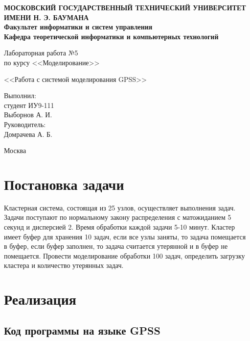 \documentclass[12pt,a4paper,oneside]{extarticle}
\begin{document}
\pgfplotsset{compat=1.8}

\thispagestyle{empty}
\newpage
{
\centering


\textbf{
МОСКОВСКИЙ ГОСУДАРСТВЕННЫЙ ТЕХНИЧЕСКИЙ УНИВЕРСИТЕТ ИМЕНИ Н. Э. БАУМАНА \\
Факультет информатики и систем управления \\
Кафедра теоретической информатики и компьютерных технологий}
\bigskip
\bigskip
\bigskip
\bigskip
\bigskip
\bigskip
\bigskip

\vfill


Лабораторная работа №5 \\
по курсу <<Моделирование>>

\bigskip

{\large <<Работа с системой моделирования GPSS>>}
\bigskip

\vfill



\hfill\parbox{4cm} {
Выполнил:\\
студент ИУ9-111 \hfill \\
Выборнов А. И.\hfill \medskip\\
Руководитель:\\
Домрачева А. Б.\hfill
}


\vspace{\fill}

Москва \number\year
\clearpage
}



\clearpage


\section{Постановка задачи}
    Кластерная система, состоящая из 25 узлов, осуществляет выполнения задач. Задачи поступают по нормальному закону распределения с матожиданием 5 секунд и дисперсией 2. Время обработки каждой задачи 5-10 минут. Кластер имеет буфер для хранения 10 задач, если все узлы заняты, то задача помещается в буфер, если буфер заполнен, то задача считается утерянной и в буфер не помещается. Провести моделирование обработки 100 задач, определить загрузку кластера и количество утерянных задач.


\section{Реализация}
    \subsection{Код программы на языке GPSS}
    \label{sec:gpss}
\end{document}
